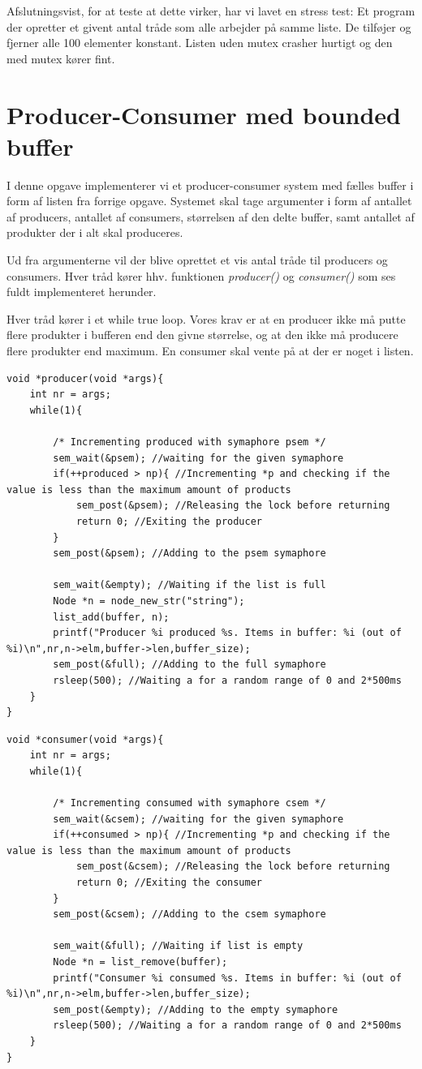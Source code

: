 \documentclass[danish]{report}
\begin{document}
Afslutningsvist, for at teste at dette virker, har vi lavet en stress test: Et program der opretter et givent antal tråde som alle arbejder på samme liste. De tilføjer og fjerner alle 100 elementer konstant. Listen uden mutex crasher hurtigt og den med mutex kører fint.


\chapter{Producer-Consumer med bounded buffer}

I denne opgave implementerer vi et producer-consumer system med fælles buffer i form af listen fra forrige opgave. Systemet skal tage argumenter i form af antallet af producers, antallet af consumers, størrelsen af den delte buffer, samt antallet af produkter der i alt skal produceres.

Ud fra argumenterne vil der blive oprettet et vis antal tråde til producers og consumers. Hver tråd kører hhv. funktionen \textit{producer()} og \textit{consumer()} som ses fuldt implementeret herunder.

Hver tråd kører i et while true loop. Vores krav er at en producer ikke må putte flere produkter i bufferen end den givne størrelse, og at den ikke må producere flere produkter end maximum. En consumer skal vente på at der er noget i listen.

\begin{lstlisting}    
void *producer(void *args){
	int nr = args;
	while(1){
	
		/* Incrementing produced with symaphore psem */
		sem_wait(&psem); //waiting for the given symaphore
		if(++produced > np){ //Incrementing *p and checking if the value is less than the maximum amount of products
			sem_post(&psem); //Releasing the lock before returning
			return 0; //Exiting the producer
		}
		sem_post(&psem); //Adding to the psem symaphore
		
		sem_wait(&empty); //Waiting if the list is full
		Node *n = node_new_str("string");
		list_add(buffer, n);
		printf("Producer %i produced %s. Items in buffer: %i (out of %i)\n",nr,n->elm,buffer->len,buffer_size);
		sem_post(&full); //Adding to the full symaphore
		rsleep(500); //Waiting a for a random range of 0 and 2*500ms
	}
}
\end{lstlisting}

\begin{lstlisting}    
void *consumer(void *args){
	int nr = args;
	while(1){
	
		/* Incrementing consumed with symaphore csem */
		sem_wait(&csem); //waiting for the given symaphore
		if(++consumed > np){ //Incrementing *p and checking if the value is less than the maximum amount of products
			sem_post(&csem); //Releasing the lock before returning
			return 0; //Exiting the consumer
		}
		sem_post(&csem); //Adding to the csem symaphore
		
		sem_wait(&full); //Waiting if list is empty
		Node *n = list_remove(buffer);
		printf("Consumer %i consumed %s. Items in buffer: %i (out of %i)\n",nr,n->elm,buffer->len,buffer_size);
		sem_post(&empty); //Adding to the empty symaphore
		rsleep(500); //Waiting a for a random range of 0 and 2*500ms
	}
}
\end{lstlisting}
\end{document}
